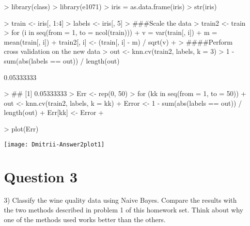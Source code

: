 \documentclass{article}
\begin{document}
\begin{Schunk}
\begin{Sinput}
> library(class)
> library(e1071)
> iris = as.data.frame(iris)
> str(iris)
\end{Sinput}
\begin{Sinput}
> train <- iris[, 1:4]
> labels <- iris[, 5]
> ###Scale the data
> train2 <- train
> for (i in seq(from = 1, to = ncol(train))) {
+   v = var(train[, i])
+   m = mean(train[, i])
+   train2[, i] <- (train[, i] - m) / sqrt(v)
+ }
> ####Perform cross validation on the new data
> out <- knn.cv(train2, labels, k = 3)
> 1 - sum(abs(labels == out)) / length(out)
\end{Sinput}
\begin{Soutput}
[1] 0.05333333
\end{Soutput}
\begin{Sinput}
> ## [1] 0.05333333
> Err <- rep(0, 50)
> for (kk in seq(from = 1, to = 50)) {
+   out <- knn.cv(train2, labels, k = kk)
+   Error <- 1 - sum(abs(labels == out)) / length(out)
+   Err[kk] <- Error
+ }
\end{Sinput}
\end{Schunk}
\begin{Schunk}
\begin{Sinput}
> plot(Err)
\end{Sinput}
\end{Schunk}
\texttt{[image: Dmitrii-Answer2plot1]}
\section*{Question 3}

3) Classify the wine quality data using Naive Bayes. Compare the results with
the two methods described in problem 1 of this homework set. Think about
why one of the methods used works better than the others.
\end{document}
